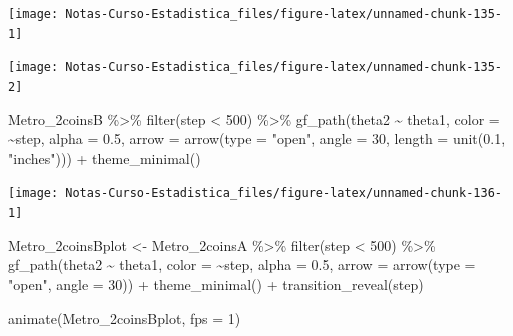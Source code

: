 \documentclass[
  12pt,
]{book}
\newenvironment{Shaded}{\begin{snugshade}}{\end{snugshade}}
\newcommand{\AttributeTok}[1]{\textcolor[rgb]{0.77,0.63,0.00}{#1}}
\newcommand{\DecValTok}[1]{\textcolor[rgb]{0.00,0.00,0.81}{#1}}
\newcommand{\FloatTok}[1]{\textcolor[rgb]{0.00,0.00,0.81}{#1}}
\newcommand{\FunctionTok}[1]{\textcolor[rgb]{0.00,0.00,0.00}{#1}}
\newcommand{\NormalTok}[1]{#1}
\newcommand{\OtherTok}[1]{\textcolor[rgb]{0.56,0.35,0.01}{#1}}
\newcommand{\SpecialCharTok}[1]{\textcolor[rgb]{0.00,0.00,0.00}{#1}}
\newcommand{\StringTok}[1]{\textcolor[rgb]{0.31,0.60,0.02}{#1}}
\theoremstyle{definition}
\theoremstyle{definition}
\theoremstyle{definition}
\theoremstyle{remark}
\begin{document}
\begin{center}\texttt{[image: Notas-Curso-Estadistica\_files/figure-latex/unnamed-chunk-135-1]} \end{center}

\begin{Shaded}
\end{Shaded}

\begin{center}\texttt{[image: Notas-Curso-Estadistica\_files/figure-latex/unnamed-chunk-135-2]} \end{center}

\begin{Shaded}
\begin{Highlighting}[]
\NormalTok{Metro\_2coinsB }\SpecialCharTok{\%\textgreater{}\%} \FunctionTok{filter}\NormalTok{(step }\SpecialCharTok{\textless{}} \DecValTok{500}\NormalTok{) }\SpecialCharTok{\%\textgreater{}\%} \FunctionTok{gf\_path}\NormalTok{(theta2 }\SpecialCharTok{\textasciitilde{}} 
\NormalTok{    theta1, }\AttributeTok{color =} \SpecialCharTok{\textasciitilde{}}\NormalTok{step, }\AttributeTok{alpha =} \FloatTok{0.5}\NormalTok{, }\AttributeTok{arrow =} \FunctionTok{arrow}\NormalTok{(}\AttributeTok{type =} \StringTok{"open"}\NormalTok{, }
    \AttributeTok{angle =} \DecValTok{30}\NormalTok{, }\AttributeTok{length =} \FunctionTok{unit}\NormalTok{(}\FloatTok{0.1}\NormalTok{, }\StringTok{"inches"}\NormalTok{))) }\SpecialCharTok{+} \FunctionTok{theme\_minimal}\NormalTok{()}
\end{Highlighting}
\end{Shaded}

\begin{center}\texttt{[image: Notas-Curso-Estadistica\_files/figure-latex/unnamed-chunk-136-1]} \end{center}

\begin{Shaded}
\begin{Highlighting}[]
\NormalTok{Metro\_2coinsBplot }\OtherTok{\textless{}{-}}\NormalTok{ Metro\_2coinsA }\SpecialCharTok{\%\textgreater{}\%} \FunctionTok{filter}\NormalTok{(step }\SpecialCharTok{\textless{}} 
    \DecValTok{500}\NormalTok{) }\SpecialCharTok{\%\textgreater{}\%} \FunctionTok{gf\_path}\NormalTok{(theta2 }\SpecialCharTok{\textasciitilde{}}\NormalTok{ theta1, }\AttributeTok{color =} \SpecialCharTok{\textasciitilde{}}\NormalTok{step, }
    \AttributeTok{alpha =} \FloatTok{0.5}\NormalTok{, }\AttributeTok{arrow =} \FunctionTok{arrow}\NormalTok{(}\AttributeTok{type =} \StringTok{"open"}\NormalTok{, }\AttributeTok{angle =} \DecValTok{30}\NormalTok{)) }\SpecialCharTok{+} 
    \FunctionTok{theme\_minimal}\NormalTok{() }\SpecialCharTok{+} \FunctionTok{transition\_reveal}\NormalTok{(step)}

\FunctionTok{animate}\NormalTok{(Metro\_2coinsBplot, }\AttributeTok{fps =} \DecValTok{1}\NormalTok{)}
\end{Highlighting}
\end{Shaded}
\end{document}
